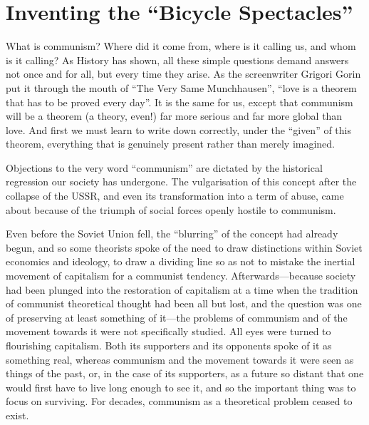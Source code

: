 \documentclass[../main]{subfiles}
\begin{document}
\ifSubfilesClassLoaded{\setcounter{page}{4}}{}
\section{Inventing the “Bicycle Spectacles”}
\label{sec:01_inventing_spectacles}

What is communism? Where did it come from, where is it calling us, and whom is it calling? As History has shown, all these simple questions demand answers not once and for all, but every time they arise. As the screenwriter Grigori Gorin put it through the mouth of “The Very Same Munchhausen”, “love is a theorem that has to be proved every day”. It is the same for us, except that communism will be a theorem (a theory, even!) far more serious and far more global than love. And first we must learn to write down correctly, under the “given” of this theorem, everything that is genuinely present rather than merely imagined.

Objections to the very word “communism” are dictated by the historical regression our society has undergone. The vulgarisation of this concept after the collapse of the USSR, and even its transformation into a term of abuse, came about because of the triumph of social forces openly hostile to communism.

Even before the Soviet Union fell, the “blurring” of the concept had already begun, and so some theorists spoke of the need to draw distinctions within Soviet economics and ideology, to draw a dividing line so as not to mistake the inertial movement of capitalism for a communist tendency. Afterwards—because society had been plunged into the restoration of capitalism at a time when the tradition of communist theoretical thought had been all but lost, and the question was one of preserving at least something of it—the problems of communism and of the movement towards it were not specifically studied. All eyes were turned to flourishing capitalism. Both its supporters and its opponents spoke of it as something real, whereas communism and the movement towards it were seen as things of the past, or, in the case of its supporters, as a future so distant that one would first have to live long enough to see it, and so the important thing was to focus on surviving. For decades, communism as a theoretical problem ceased to exist.
\end{document}
